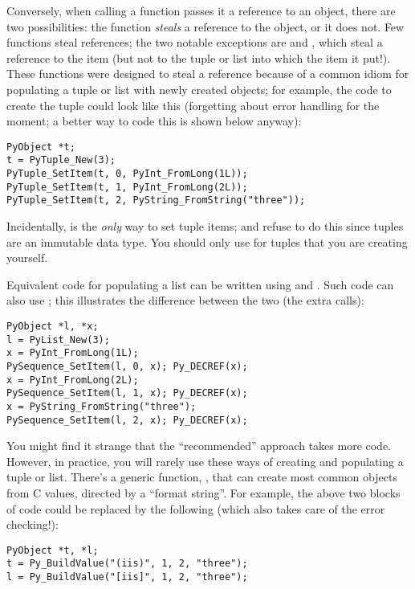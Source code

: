 Conversely, when calling a function passes it a reference to an 
object, there are two possibilities: the function \emph{steals} a 
reference to the object, or it does not.  Few functions steal 
references; the two notable exceptions are  and 
, which steal a reference to the item (but not to 
the tuple or list into which the item it put!).  These functions were
designed to steal a reference because of a common idiom for populating
a tuple or list with newly created objects; for example, the code to
create the tuple  could look like this
(forgetting about error handling for the moment; a better way to code
this is shown below anyway):

\begin{verbatim}
PyObject *t;
t = PyTuple_New(3);
PyTuple_SetItem(t, 0, PyInt_FromLong(1L));
PyTuple_SetItem(t, 1, PyInt_FromLong(2L));
PyTuple_SetItem(t, 2, PyString_FromString("three"));
\end{verbatim}

Incidentally,  is the \emph{only} way to set
tuple items;  and 
refuse to do this since tuples are an immutable data type.  You should
only use  for tuples that you are creating
yourself.

Equivalent code for populating a list can be written using 
 and .  Such code can also 
use ; this illustrates the difference 
between the two (the extra  calls):

\begin{verbatim}
PyObject *l, *x;
l = PyList_New(3);
x = PyInt_FromLong(1L);
PySequence_SetItem(l, 0, x); Py_DECREF(x);
x = PyInt_FromLong(2L);
PySequence_SetItem(l, 1, x); Py_DECREF(x);
x = PyString_FromString("three");
PySequence_SetItem(l, 2, x); Py_DECREF(x);
\end{verbatim}

You might find it strange that the ``recommended'' approach takes more
code.  However, in practice, you will rarely use these ways of
creating and populating a tuple or list.  There's a generic function,
, that can create most common objects from C 
values, directed by a ``format string''.  For example, the above two 
blocks of code could be replaced by the following (which also takes 
care of the error checking!):

\begin{verbatim}
PyObject *t, *l;
t = Py_BuildValue("(iis)", 1, 2, "three");
l = Py_BuildValue("[iis]", 1, 2, "three");
\end{verbatim}

